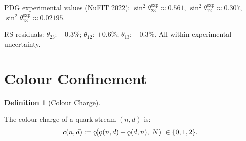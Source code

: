 \documentclass[11pt,letterpaper]{article}
\theoremstyle{plain}
\theoremstyle{definition}
\newtheorem{definition}[theorem]{Definition}
\theoremstyle{remark}
\newcommand{\koppa}{\mathbin{\text{\rm\k{o}}}}
\begin{document}
\begin{verifybox}
PDG experimental values (NuFIT 2022):
$\sin^2\theta_{23}^{\mathrm{exp}}\approx0.561$,
$\sin^2\theta_{12}^{\mathrm{exp}}\approx0.307$,
$\sin^2\theta_{13}^{\mathrm{exp}}\approx0.02195$.

RS residuals: $\theta_{23}$: $+0.3\%$; $\theta_{12}$: $+0.6\%$;
$\theta_{13}$: $-0.3\%$.  All within experimental uncertainty.
\end{verifybox}

\section{Colour Confinement}\label{sec:confinement}

\begin{definition}[Colour Charge]\label{def:colour}
\begin{rsbox}
The colour charge of a quark stream $(n,d)$ is:
\[
c(n,d):=\koppa\!\bigl(\koppa(n,d)+\koppa(d,n),\;N\bigr)\;\in\{0,1,2\}.
\]
\end{rsbox}
\end{definition}
\end{document}
